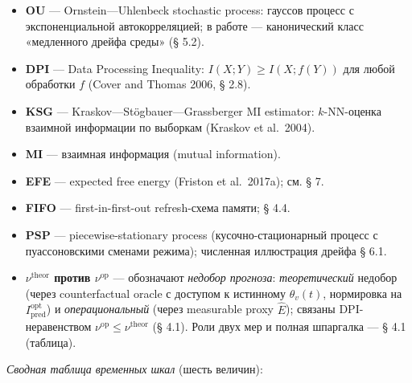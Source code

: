 \documentclass[pdflatex,sn-mathphys-ay]{sn-jnl}
\providecommand{\tightlist}{\setlength{\itemsep}{0pt}\setlength{\parskip}{0pt}}
\begin{document}
\begin{itemize}

\tightlist

\item

  \textbf{OU} --- Ornstein---Uhlenbeck stochastic process: гауссов процесс с экспоненциальной автокорреляцией; в работе --- канонический класс «медленного дрейфа среды» (§ 5.2).

\item

  \textbf{DPI} --- Data Processing Inequality: \(I(X; Y) \ge I(X; f(Y))\) для любой обработки \(f\) (Cover and Thomas 2006, § 2.8).

\item

  \textbf{KSG} --- Kraskov---Stögbauer---Grassberger MI estimator: \(k\)-NN-оценка взаимной информации по выборкам (Kraskov et al.~2004).

\item

  \textbf{MI} --- взаимная информация (mutual information).

\item

  \textbf{EFE} --- expected free energy (Friston et al.~2017a); см. § 7.

\item

  \textbf{FIFO} --- first-in-first-out refresh-схема памяти; § 4.4.

\item

  \textbf{PSP} --- piecewise-stationary process (кусочно-стационарный процесс с пуассоновскими сменами режима); численная иллюстрация дрейфа § 6.1.

\item

  \textbf{\(\nu^{\text{theor}}\) против \(\nu^{\text{op}}\)} --- обозначают \emph{недобор прогноза}: \emph{теоретический} недобор (через counterfactual oracle с доступом к истинному \(\theta_v(t)\), нормировка на \(I_{\text{pred}}^{\text{opt}}\)) и \emph{операциональный} (через measurable proxy \(\hat E\)); связаны DPI-неравенством \(\nu^{\text{op}} \le \nu^{\text{theor}}\) (§ 4.1). Роли двух мер и полная шпаргалка --- § 4.1 (таблица).

\end{itemize}



\emph{Сводная таблица временных шкал} (шесть величин):
\end{document}
